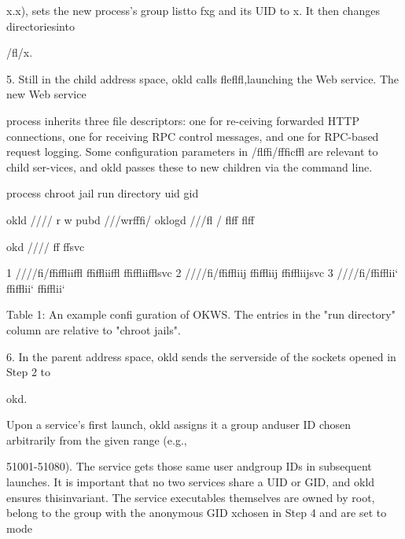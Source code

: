 x.x), sets the new process's group listto
fxg and its UID to x. It then changes directoriesinto

/\Pi \Xi \Theta fl\Delta /x.

5. Still in the child address space, okld calls flefl\Pi \Omega fl,launching the Web service. The new Web service

process inherits three file descriptors: one for re-ceiving forwarded HTTP connections, one for receiving RPC control messages, and one for RPC-based request logging. Some configuration parameters in /flffi\Pi /\Xi fffi\Delta  \Pi \Xi \Psi c\Phi ffl are relevant to child ser-vices, and okld passes these to new children via the
command line.

process chroot jail run directory uid gid

okld /\Gamma \Delta \Theta /\Lambda \Xi \Pi \Sigma /\Theta \Upsilon \Phi  / \Theta \Lambda \Lambda r \Pi w\Psi \Psi \Omega 
pubd /\Gamma \Delta \Theta /\Lambda \Xi \Pi \Sigma /wrff\Lambda fi\Sigma  / \Pi \Pi \Pi  \Pi \Pi \Pi 
oklogd /\Gamma \Delta \Theta /\Lambda \Xi \Pi \Sigma /\Omega \Lambda fl / \Lambda \Xi \Omega \Lambda flff \Lambda \Xi \Omega \Lambda flff

okd /\Gamma \Delta \Theta /\Lambda \Xi \Pi \Sigma /\Theta \Upsilon \Phi  / \Lambda \Xi ff \Lambda \Xi ffsvc

1 /\Gamma \Delta \Theta /\Lambda \Xi \Pi \Sigma /\Theta \Upsilon \Phi  /fi\Lambda \Theta \Psi \Sigma /ffiffliiffl ffiffliiffl ffiffliifflsvc
2 /\Gamma \Delta \Theta /\Lambda \Xi \Pi \Sigma /\Theta \Upsilon \Phi  /fi\Lambda \Theta \Psi \Sigma /ffiffliij ffiffliij ffiffliijsvc
3 /\Gamma \Delta \Theta /\Lambda \Xi \Pi \Sigma /\Theta \Upsilon \Phi  /fi\Lambda \Theta \Psi \Sigma /ffifflii` ffifflii` ffifflii`

Table 1: An example confi guration of OKWS. The entries in
the "run directory" column are relative to "chroot jails".

6. In the parent address space, okld sends the serverside of the sockets opened in Step 2 to

okd.

Upon a service's first launch, okld assigns it a group anduser ID chosen arbitrarily from the given range (e.g.,

51001-51080). The service gets those same user andgroup IDs in subsequent launches. It is important that no
two services share a UID or GID, and okld ensures thisinvariant. The service executables themselves are owned
by root, belong to the group with the anonymous GID xchosen in Step 4 and are set to mode

